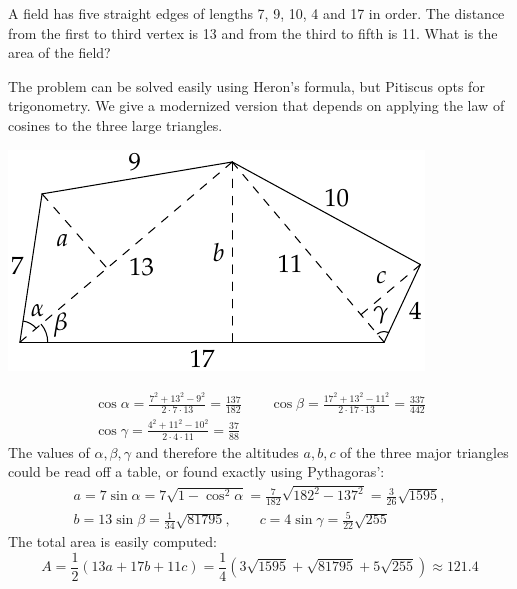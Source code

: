 \begin{minipage}[t]{0.58\linewidth}\vspace{0pt}
	\label{ex:pitiscus}
	
	A field has five straight edges of lengths 7, 9, 10, 4 and 17 in order. The distance from the first to third vertex is 13 and from the third to fifth is 11. What is the area of the field?\smallbreak
	
	The problem can be solved easily using Heron's formula, but Pitiscus opts for trigonometry. We give a modernized version that depends on applying the law of cosines to the three large triangles.
\end{minipage}
\hfill
\begin{minipage}[t]{0.4\linewidth}\vspace{0pt}
	\flushright\includegraphics[scale=0.9]{ren-pitiscus}
\end{minipage}\smallbreak

\begin{gather*}
	\cos\alpha=\frac{7^2+13^2-9^2}{2\cdot 7\cdot 13} =\frac{137}{182}\qquad
	\cos\beta=\frac{17^2+13^2-11^2}{2\cdot 17\cdot 13} =\frac{337}{442}\\
	\cos\gamma=\frac{4^2+11^2-10^2}{2\cdot 4\cdot 11} =\frac{37}{88}
\end{gather*}
The values of $\alpha,\beta,\gamma$ and therefore the altitudes $a,b,c$ of the three major triangles could be read off a table, or found exactly using Pythagoras':
\begin{gather*}
	a=7\sin\alpha=7\sqrt{1-\cos^2\!\alpha}=\frac 7{182}\sqrt{182^2-137^2} =\frac 3{26}\sqrt{1595},\\
	b=13\sin\beta=\frac{1}{34}\sqrt{81795},\qquad c=4\sin\gamma =\frac 5{22}\sqrt{255}
\end{gather*}
The total area is easily computed:
\[
	A=\frac 12(13a+17b+11c)=\frac 14\left(3\sqrt{1595} + \sqrt{81795} + 5\sqrt{255}\right) \approx 121.4
\]

